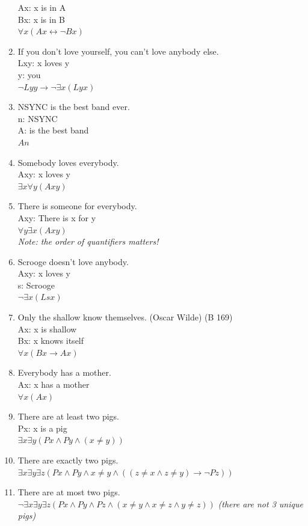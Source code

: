 \documentclass{article}
\begin{document}
\begin{enumerate}
            Ax: x is in A\\
            Bx: x is in B\\
            $\forall x(Ax \leftrightarrow \neg Bx)$
      \item If you don't love yourself, you can't love anybody else.\\
            Lxy: x loves y\\
            y: you\\
            $\neg Lyy \to \neg \exists x(Lyx)$
      \item NSYNC is the best band ever.\\
            n: NSYNC\\
            A: is the best band\\
            $An$
      \item Somebody loves everybody.\\
            Axy: x loves y\\
            $\exists x \forall y (Axy)$
      \item There is someone for everybody.\\
            Axy: There is x for y\\
            $\forall y \exists x(Axy)$\\
            \textit{Note: the order of quantifiers matters!}
      \item Scrooge doesn't love anybody.\\
            Axy: x loves y\\
            s: Scrooge\\
            $\neg \exists x (Lsx)$
      \item Only the shallow know themselves. (Oscar Wilde) (B 169)\\
            Ax: x is shallow\\
            Bx: x knows itself\\
            $\forall x(Bx \to Ax)$
      \item Everybody has a mother.\\
            Ax: x has a mother\\
            $\forall x(Ax)$
      \item There are at least two pigs.\\
            Px: x is a pig\\
            $\exists x \exists y (Px \land Py \land (x \neq y))$
      \item There are exactly two pigs.\\
            $\exists x \exists y \exists z (Px \land Py \land x \neq y \land ((z \neq x \land z \neq y) \to \neg Pz))$
      \item There are at most two pigs.\\ 
            $\neg \exists x \exists y \exists z (Px \land Py \land Pz \land (x \neq y \land x \neq z \land y \neq z))$
            \textit{(there are not 3 unique pigs)}
      
\end{enumerate}
\end{document}

